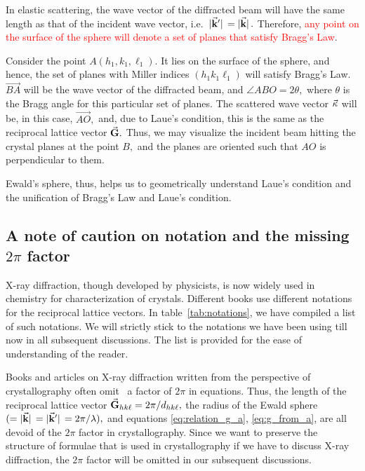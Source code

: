 	In elastic scattering, the wave vector of the diffracted beam will have the same length as that of the incident wave vector, i.e.\ $\abs*{\va{k}'} = \abs*{\va{k}}.$  Therefore, \textcolor{red}{any point on the surface of the sphere will denote a set of planes that satisfy Bragg's Law}.
	
	Consider the point $A(h_1, k_1, \ell_1).$ It lies on the surface of the sphere, and hence, the set of planes with Miller indices $(h_1 k_1 \ell_1)$ will satisfy Bragg's Law. $\overrightarrow{BA}$ will be the wave vector of the diffracted beam, and $\angle ABO = 2\theta,$ where $\theta$ is the Bragg angle for this particular set of planes. The scattered wave vector $\va{\kappa}$ will be, in this case, $\overrightarrow{AO},$ and, due to Laue's condition, this is the same as the reciprocal lattice vector $\va{G}.$ Thus, we may visualize the incident beam hitting the crystal planes at the point $B,$ and the planes are oriented such that $AO$ is perpendicular to them.
	
	Ewald's sphere, thus, helps us to geometrically understand Laue's condition and the unification of Bragg's Law and Laue's condition.
	

\subsection*{A note of caution on notation and the missing $2\pi$ factor}

X-ray diffraction, though developed by physicists, is now widely used in chemistry for characterization of crystals. Different books use different notations for the reciprocal lattice vectors. In table~\ref{tab:notations}, we have compiled a list of such notations. We will strictly stick to the notations we have been using till now in all subsequent discussions. The list is provided for the ease of understanding of the reader.

Books and articles on X-ray diffraction written from the perspective of crystallography often omit~\cite[chapter~5]{Waseda2011} a factor of $2\pi$ in equations. Thus, the length of the reciprocal lattice vector $\va{G}_{hk\ell} = 2\pi / d_{hk\ell},$ the radius of the Ewald sphere $(=\abs*{\va{k}} = \abs*{\va{k}'} = 2\pi / \lambda),$ and equations \eqref{eq:relation_g_a}, \eqref{eq:g_from_a}, are all devoid of the $2\pi$ factor in crystallography. Since we want to preserve the structure of formulae that is used in crystallography if we have to discuss X-ray diffraction, the $2\pi$ factor will be omitted in our subsequent discussions.

